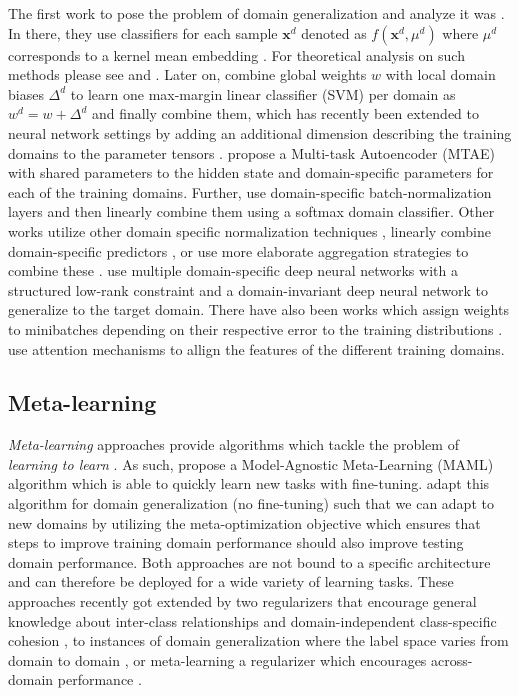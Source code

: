 The first work to pose the problem of domain generalization and analyze it was \citet{BlanchardLS11}. In there, they use classifiers for each sample $\mathbf{x}^d$  denoted as $f(\mathbf{x}^d,\mu^d)$ where $\mu^d$ corresponds to a kernel mean embedding \citep{MuandetFSS17}. For theoretical analysis on such methods please see \citet{an2019generalization} and \citet{blanchard2017domain}. Later on, \citet{KhoslaZMET12} combine global weights $w$ with local domain biases $\Delta^d$ to learn one max-margin linear classifier (SVM) per domain as $w^d = w + \Delta^d$ and finally combine them, which has recently been extended to neural network settings by adding an additional dimension describing the training domains to the parameter tensors \citep{LiYSH17}. \citet{GhifaryKZB15} propose a Multi-task Autoencoder (MTAE) with shared parameters to the hidden state and domain-specific parameters for each of the training domains. Further, \citet{ManciniBCR18} use domain-specific batch-normalization \citep{IoffeS15} layers and then linearly combine them using a softmax domain classifier. Other works utilize other domain specific normalization techniques \citep{seo2019learning}, linearly combine domain-specific predictors \citep{ManciniBC018}, or use more elaborate aggregation strategies to combine these \citep{DInnocenteC18}. \citet{DingF18} use multiple
domain-specific deep neural networks with a structured low-rank constraint and a domain-invariant deep neural network to generalize to the target domain. There have also been works which assign weights to minibatches depending on their respective error to the training distributions \citep{HuNSS18, sagawa2019distributionally}. \citet{jin2020feature} use attention mechanisms to allign the features of the different training domains.

\subsection{Meta-learning}
\emph{Meta-learning} approaches provide algorithms which tackle the problem of  \emph{learning  to learn} \citep{1998TP, SchmidhuberZW97}.
 As such, \citet{FinnAL17} propose a Model-Agnostic Meta-Learning (MAML) algorithm which is able to quickly learn new tasks with fine-tuning. \citet{LiYSH18} adapt this algorithm for domain generalization (no fine-tuning) such that we can adapt to new domains by utilizing the meta-optimization objective which ensures that steps to improve training domain performance should also improve testing domain performance. Both approaches are not bound to a specific architecture and can therefore be deployed for a wide variety of learning tasks. These approaches recently got extended by two regularizers that encourage general knowledge about inter-class relationships and domain-independent class-specific cohesion \citep{DouCKG19}, to instances of domain generalization where the label space varies from domain to domain \citep{LiYZH19}, or meta-learning a regularizer which encourages across-domain performance \citep{BalajiSC18}.

